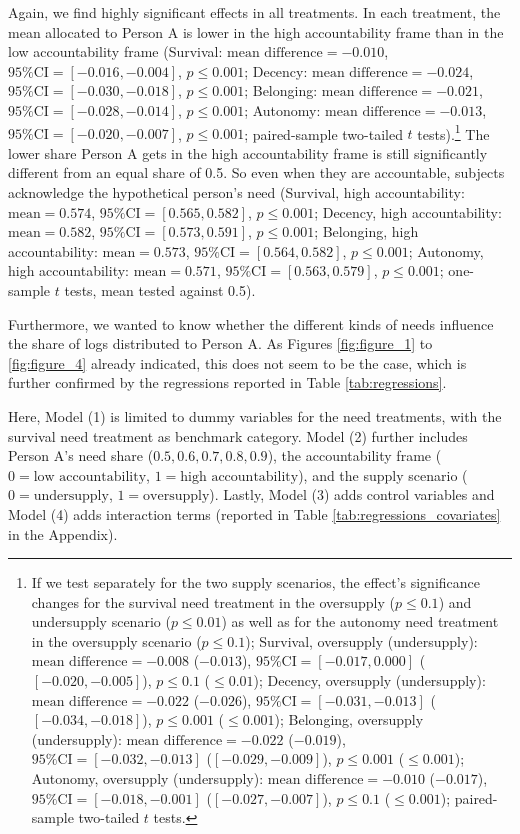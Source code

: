 \documentclass[egregdoesnotlikesansseriftitles]{scrartcl}
\begin{document}
Again, we find highly significant effects in all treatments.
In each treatment, the mean allocated to Person A is lower in the high accountability frame than in the low accountability frame (Survival: $\text{mean difference}=-0.010$, $\text{95\% CI}=[-0.016,-0.004]$, $p\le0.001$; Decency: $\text{mean difference}=-0.024$, $\text{95\% CI}=[-0.030,-0.018]$, $p\le0.001$; Belonging: $\text{mean difference}=-0.021$, $\text{95\% CI}=[-0.028,-0.014]$, $p\le0.001$; Autonomy: $\text{mean difference}=-0.013$, $\text{95\% CI}=[-0.020,-0.007]$, $p\le0.001$; paired-sample two-tailed $t$ tests).\footnote{If we test separately for the two supply scenarios, the effect's significance changes for the survival need treatment in the oversupply ($p\le0.1$) and undersupply scenario ($p\le0.01$) as well as for the autonomy need treatment in the oversupply scenario ($p\le0.1$); Survival, oversupply (undersupply): $\text{mean difference}=-0.008$ ($-0.013$), $\text{95\% CI}=[-0.017,0.000]$ ($[-0.020,-0.005]$), $p\le0.1$ ($\le0.01$); Decency, oversupply (undersupply): $\text{mean difference}=-0.022$ ($-0.026$), $\text{95\% CI}=[-0.031,-0.013]$ ($[-0.034,-0.018]$), $p\le0.001$ ($\le0.001$); Belonging, oversupply (undersupply): $\text{mean difference}=-0.022$ ($-0.019$), $\text{95\% CI}=[-0.032,-0.013]$ ($[-0.029,-0.009]$), $p\le0.001$ ($\le0.001$); Autonomy, oversupply (undersupply): $\text{mean difference}=-0.010$ ($-0.017$), $\text{95\% CI}=[-0.018,-0.001]$ ($[-0.027,-0.007]$), $p\le0.1$ ($\le0.001$); paired-sample two-tailed $t$ tests.}
The lower share Person A gets in the high accountability frame is still significantly different from an equal share of 0.5.
So even when they are accountable, subjects acknowledge the hypothetical person's need (Survival, high accountability: $\text{mean}=0.574$, $\text{95\% CI}=[0.565,0.582]$, $p\le0.001$; Decency, high accountability: $\text{mean}=0.582$, $\text{95\% CI}=[0.573,0.591]$, $p\le0.001$; Belonging, high accountability: $\text{mean}=0.573$, $\text{95\% CI}=[0.564,0.582]$, $p\le0.001$; Autonomy, high accountability: $\text{mean}=0.571$, $\text{95\% CI}=[0.563,0.579]$, $p\le0.001$; one-sample $t$ tests, mean tested against 0.5).

Furthermore, we wanted to know whether the different kinds of needs influence the share of logs distributed to Person A.
As Figures \ref{fig:figure_1} to \ref{fig:figure_4} already indicated, this does not seem to be the case, which is further confirmed by the regressions reported in Table \ref{tab:regressions}.

Here, Model (1) is limited to dummy variables for the need treatments, with the survival need treatment as benchmark category.
Model (2) further includes Person A's need share ($0.5,0.6,0.7,0.8,0.9$), the accountability frame ($0=\text{low accountability}$, $1=\text{high accountability}$), and the supply scenario ($0=\text{undersupply}$, $1=\text{oversupply}$).
Lastly, Model (3) adds control variables and Model (4) adds interaction terms (reported in Table \ref{tab:regressions_covariates} in the Appendix).
\end{document}
